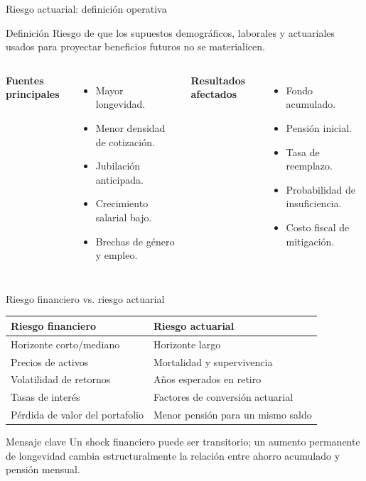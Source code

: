 \documentclass[aspectratio=169,11pt]{beamer}
\begin{document}
\begin{frame}{Riesgo actuarial: definición operativa}
\begin{block}{Definición}
Riesgo de que los supuestos demográficos, laborales y actuariales usados para proyectar beneficios futuros no se materialicen.
\end{block}

\begin{columns}
\textbf{Fuentes principales}
\begin{itemize}
  \item Mayor longevidad.
  \item Menor densidad de cotización.
  \item Jubilación anticipada.
  \item Crecimiento salarial bajo.
  \item Brechas de género y empleo.
\end{itemize}

\textbf{Resultados afectados}
\begin{itemize}
  \item Fondo acumulado.
  \item Pensión inicial.
  \item Tasa de reemplazo.
  \item Probabilidad de insuficiencia.
  \item Costo fiscal de mitigación.
\end{itemize}
\end{columns}
\end{frame}

\begin{frame}{Riesgo financiero vs. riesgo actuarial}
\begin{table}
\centering
\begin{tabular}{p{}p{}}
\toprule
\textbf{Riesgo financiero} & \textbf{Riesgo actuarial} \\
\midrule
Horizonte corto/mediano & Horizonte largo \\
Precios de activos & Mortalidad y supervivencia \\
Volatilidad de retornos & Años esperados en retiro \\
Tasas de interés & Factores de conversión actuarial \\
Pérdida de valor del portafolio & Menor pensión para un mismo saldo \\
\bottomrule
\end{tabular}
\end{table}

\begin{alertblock}{Mensaje clave}
Un shock financiero puede ser transitorio; un aumento permanente de longevidad cambia estructuralmente la relación entre ahorro acumulado y pensión mensual.
\end{alertblock}
\end{frame}
\end{document}
